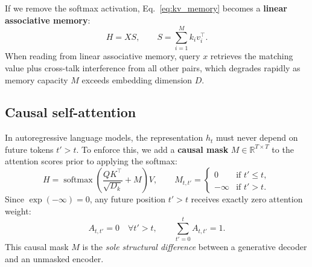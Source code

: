 \documentclass[11pt,a4paper]{article}
\newcommand{\R}{\mathbb{R}}
\DeclareMathOperator{\softmax}{softmax}
\newcommand{\slides}[1]{\par\nopagebreak\noindent{\normalfont\small\emph{(slides #1)}}\par\nopagebreak\vspace{2pt}}
\theoremstyle{definition}
\theoremstyle{plain}
\begin{document}
If we remove the softmax activation, Eq.~\eqref{eq:kv_memory} becomes a \textbf{linear associative memory}:
\begin{equation}
H = X S, \qquad S = \sum_{i=1}^M k_i v_i^\top.
\end{equation}
When reading from linear associative memory, query $x$ retrieves the matching value plus cross-talk interference from all other pairs, which degrades rapidly as memory capacity $M$ exceeds embedding dimension $D$.

\subsection{Causal self-attention}\slides{35 / 84}
In autoregressive language models, the representation $h_t$ must never depend on future tokens $t' > t$. To enforce this, we add a \textbf{causal mask} $M \in \R^{T \times T}$ to the attention scores prior to applying the softmax:
\begin{equation}\label{eq:causal_sa}
H = \softmax \left( \frac{Q K^\top}{\sqrt{D_k}} + M \right) V, \qquad M_{t, t'} = \begin{cases} 0 & \text{if } t' \le t, \\ -\infty & \text{if } t' > t. \end{cases}
\end{equation}
Since $\exp(-\infty) = 0$, any future position $t' > t$ receives exactly zero attention weight:
\begin{equation}
A_{t, t'} = 0 \quad \forall t' > t, \qquad \sum_{t'=0}^t A_{t, t'} = 1.
\end{equation}
This causal mask $M$ is the \emph{sole structural difference} between a generative decoder and an unmasked encoder.
\end{document}
